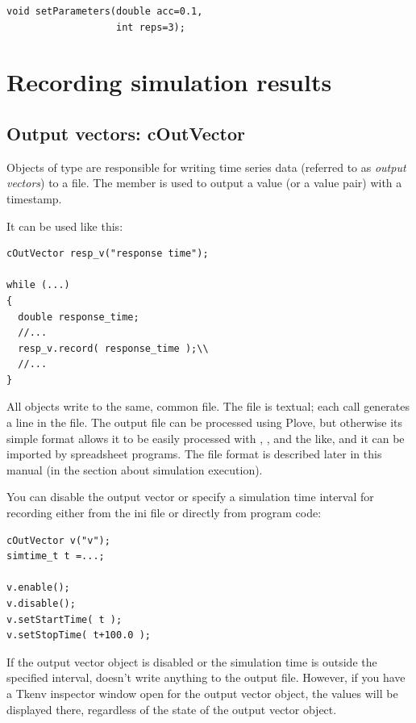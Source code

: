 \begin{Verbatim}
void setParameters(double acc=0.1, 
                   int reps=3);
\end{Verbatim}




\section{Recording simulation results}

\subsection{Output vectors: cOutVector}

Objects of type  are responsible for writing time series 
data (referred to as \textit{output vectors}) to a file. The  
member is used to output a value (or a value pair) with a timestamp. 

It can be used like this:

\begin{Verbatim}
cOutVector resp_v("response time");

while (...)
{
  double response_time;
  //...
  resp_v.record( response_time );\\
  //...
}
\end{Verbatim}


All  objects write to the same, common file. The
file is textual; each  call generates a line in the
file. The output file can be processed using Plove, but otherwise its
simple format allows it to be easily processed with ,
,  and the like, and it can be imported by
spreadsheet programs.  The file format is described later in this
manual (in the section about simulation execution).

You can disable the output vector or specify a
simulation time interval for recording either from the ini file or
directly from program code:

\begin{Verbatim}
cOutVector v("v");
simtime_t t =...;

v.enable();
v.disable();
v.setStartTime( t );
v.setStopTime( t+100.0 );
\end{Verbatim}


If the output vector object is disabled or the simulation time is
outside the specified interval,  doesn't write
anything to the output file. However, if you have a Tkenv inspector
window open for the output vector object,
the values will be displayed there, regardless of the state of the
output vector object.





